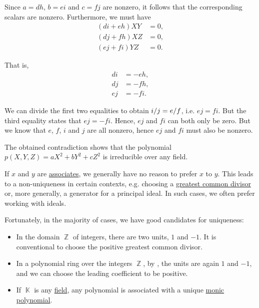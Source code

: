 \begin{example}
\begin{thmenum}
    Since \( a = dh \), \( b = ei \) and \( c = fj \) are nonzero, it follows that the corresponding scalars are nonzero. Furthermore, we must have
    \begin{align*}
      (d i + e h) X Y &= 0, \\
      (d j + f h) X Z &= 0, \\
      (e j + f i) Y Z &= 0.
    \end{align*}

    That is,
    \begin{align*}
      d i &= - e h, \\
      d j &= - f h, \\
      e j &= - f i.
    \end{align*}

    We can divide the first two equalities to obtain \( \ifrac i j = \ifrac e f \), i.e. \( ej = fi \). But the third equality states that \( ej = -fi \). Hence, \( ej \) and \( fi \) can both only be zero. But we know that \( e \), \( f \), \( i \) and \( j \) are all nonzero, hence \( ej \) and \( fi \) must also be nonzero.

    The obtained contradiction shows that the polynomial \( p(X, Y, Z) = a X^2 + b Y^2 + c Z^2 \) is irreducible over any field.
  \end{thmenum}
\end{example}

\begin{remark}\label{rem:choice_of_associates}
  If \( x \) and \( y \) are \hyperref[def:domain_divisibility/associates]{associates}, we generally have no reason to prefer \( x \) to \( y \). This leads to a non-uniqueness in certain contexts, e.g. choosing a \hyperref[def:gcd_and_lcm]{greatest common divisor} or, more generally, a generator for a principal ideal. In such cases, we often prefer working with ideals.

  Fortunately, in the majority of cases, we have good candidates for uniqueness:
  \begin{itemize}
    \item In the domain \( \BbbZ \) of integers, there are two units, \( 1 \) and \( -1 \). It is conventional to choose the positive greatest common divisor.

    \item In a polynomial ring over the integers \( \BbbZ \), by , the units are again \( 1 \) and \( -1 \), and we can choose the leading coefficient to be positive.

    \item If \( \BbbK \) is any \hyperref[def:field]{field}, any polynomial is associated with a unique \hyperref[def:monic_polynomial]{monic polynomial}.
  \end{itemize}
\end{remark}

